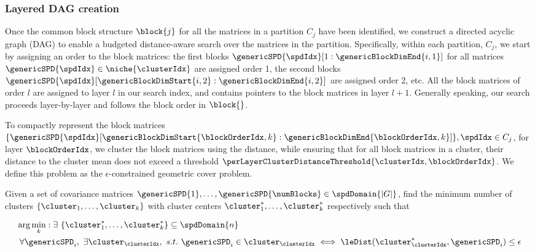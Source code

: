 \documentclass[pdflatex,sn-mathphys-num]{sn-jnl}%
\theoremstyle{thmstyleone}%
\theoremstyle{thmstyletwo}%
\theoremstyle{thmstylethree}%
\begin{document}
\newcommand{\norm}[1]{\left\lVert#1\right\rVert}



\subsubsection{Layered DAG creation} 
%
Once the common block structure $\block{j}$ for all the matrices in a partition $C_j$ have been identified, we construct a directed acyclic graph (DAG) to enable a budgeted distance-aware search over the matrices in the partition. Specifically, within each partition, $C_j$, we start by assigning an order to the block matrices: the first blocks  
$\genericSPD{\spdIdx}[1:\genericBlockDimEnd{i,1}]$ for all matrices $\genericSPD{\spdIdx} \in \niche{\clusterIdx}$ are assigned order 1, the second blocks $\genericSPD{\spdIdx}[\genericBlockDimStart{i,2}:\genericBlockDimEnd{i,2}]$ are assigned order 2, etc. All the block matrices of order $l$ are assigned to layer $l$ in our search index, and contains pointers to the block matrices in layer $l+1$. Generally speaking, our search proceeds layer-by-layer and follows the block order in $\block{}$. 


To compactly represent the block matrices $\{ \genericSPD{\spdIdx}[\genericBlockDimStart{\blockOrderIdx,k}:\genericBlockDimEnd{\blockOrderIdx,k}] \}, \spdIdx \in C_j$, for layer $\blockOrderIdx$, we cluster the block matrices using the \logEuclid distance, while ensuring that for all block matrices in a cluster, their \logEuclid distance to the cluster mean does not exceed a threshold $\perLayerClusterDistanceThreshold{\clusterIdx, \blockOrderIdx}$. We define this problem 
as the $\epsilon$-constrained geometric cover problem.

\begin{definition}
\label{defn:eps_set_cover}
Given a set of covariance matrices $\genericSPD{1}, \dots, \genericSPD{\numBlocks} \in \spdDomain{|G|}$, find the minimum number of clusters $\{\cluster_1, \dots, \cluster_k\}$
with cluster centers $\cluster_1^{\ast}, \dots, \cluster_k^{\ast}$ respectively
such that

\begin{eqnarray}
& \arg\min_k: \exists ~\{\cluster_1^{\ast}, \dots, \cluster_k^{\ast}\} \subseteq \spdDomain{n} \nonumber \\
& ~\forall \genericSPD_i, ~\exists \cluster_\clusterIdx, ~s.t. ~\genericSPD_i \in \cluster_\clusterIdx \iff  \leDist(\cluster_\clusterIdx^{\ast}, \genericSPD_i) \le \epsilon \label{eq:epsilon_const}
\end{eqnarray} 
\end{definition}
\end{document}
